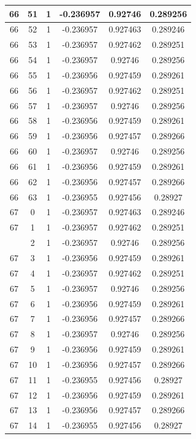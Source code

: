 \documentclass[12pt,a4paper]{article}
\numberwithin{equation}{section}
\numberwithin{figure}{section}
\numberwithin{table}{section}
\begin{document}
\begin{longtable}{|c|c|c|c|c|c|}
66 & 51 & 1 & -0.236957 & 0.92746 & 0.289256 \\ \hline
66 & 52 & 1 & -0.236957 & 0.927463 & 0.289246 \\ \hline
66 & 53 & 1 & -0.236957 & 0.927462 & 0.289251 \\ \hline
66 & 54 & 1 & -0.236957 & 0.92746 & 0.289256 \\ \hline
66 & 55 & 1 & -0.236956 & 0.927459 & 0.289261 \\ \hline
66 & 56 & 1 & -0.236957 & 0.927462 & 0.289251 \\ \hline
66 & 57 & 1 & -0.236957 & 0.92746 & 0.289256 \\ \hline
66 & 58 & 1 & -0.236956 & 0.927459 & 0.289261 \\ \hline
66 & 59 & 1 & -0.236956 & 0.927457 & 0.289266 \\ \hline
66 & 60 & 1 & -0.236957 & 0.92746 & 0.289256 \\ \hline
66 & 61 & 1 & -0.236956 & 0.927459 & 0.289261 \\ \hline
66 & 62 & 1 & -0.236956 & 0.927457 & 0.289266 \\ \hline
66 & 63 & 1 & -0.236955 & 0.927456 & 0.28927 \\ \hline
67 & 0 & 1 & -0.236957 & 0.927463 & 0.289246 \\ \hline
67 & 1 & 1 & -0.236957 & 0.927462 & 0.289251 \\ \hline
\pagebreak
67 & 2 & 1 & -0.236957 & 0.92746 & 0.289256 \\ \hline
67 & 3 & 1 & -0.236956 & 0.927459 & 0.289261 \\ \hline
67 & 4 & 1 & -0.236957 & 0.927462 & 0.289251 \\ \hline
67 & 5 & 1 & -0.236957 & 0.92746 & 0.289256 \\ \hline
67 & 6 & 1 & -0.236956 & 0.927459 & 0.289261 \\ \hline
67 & 7 & 1 & -0.236956 & 0.927457 & 0.289266 \\ \hline
67 & 8 & 1 & -0.236957 & 0.92746 & 0.289256 \\ \hline
67 & 9 & 1 & -0.236956 & 0.927459 & 0.289261 \\ \hline
67 & 10 & 1 & -0.236956 & 0.927457 & 0.289266 \\ \hline
67 & 11 & 1 & -0.236955 & 0.927456 & 0.28927 \\ \hline
67 & 12 & 1 & -0.236956 & 0.927459 & 0.289261 \\ \hline
67 & 13 & 1 & -0.236956 & 0.927457 & 0.289266 \\ \hline
67 & 14 & 1 & -0.236955 & 0.927456 & 0.28927 \\ \hline

\end{longtable}
\end{document}

